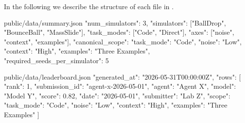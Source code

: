 \documentclass[11pt]{article}
\begin{document}
In the following we describe the structure of each file in .
\label{sec:website-summary-json}
\begin{DocCode}
public/data/summary.json
{
  "num_simulators": 3,
  "simulators": ["BallDrop", "BounceBall", "MassSlide"],
  "task_modes": ["Code", "Direct"],
  "axes": ["noise", "context", "examples"],
  "canonical_scope": {
    "task_mode": "Code",
    "noise": "Low",
    "context": "High",
    "examples": "Three Examples",
    "required_seeds_per_simulator": 5
  }
}
\end{DocCode}
\label{sec:website-leaderboard-json}
\begin{DocCode}
public/data/leaderboard.json
{
  "generated_at": "2026-05-31T00:00:00Z",
  "rows": [
    {
      "rank": 1,
      "submission_id": "agent-x-2026-05-01",
      "agent": "Agent X",
      "model": "Model Y",
      "score": 0.82,
      "date": "2026-05-01",
      "submitter": "Lab Z",
      "scope": {
        "task_mode": "Code",
        "noise": "Low",
        "context": "High",
        "examples": "Three Examples"
      }
    }
  ]
}
\end{DocCode}
\label{sec:website-environment-description-json}
\end{document}
